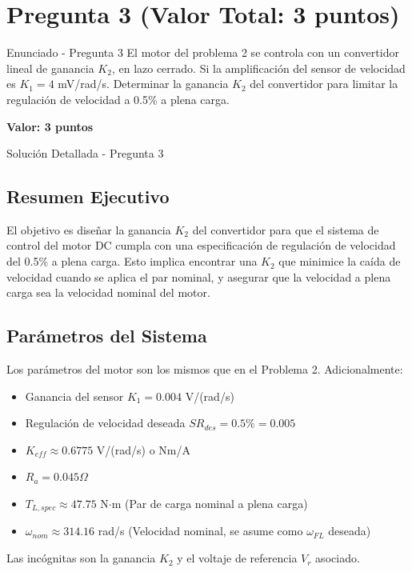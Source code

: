 \documentclass[12pt]{article}
\begin{document}
\newpage
\section{Pregunta 3 (Valor Total: 3 puntos)}
\begin{problemstatementbox}{Enunciado - Pregunta 3}
El motor del problema 2 se controla con un convertidor lineal de ganancia $K_2$, en lazo cerrado. Si la amplificación del sensor de velocidad es $K_1 = 4$ mV/rad/s. Determinar la ganancia $K_2$ del convertidor para limitar la regulación de velocidad a 0.5\% a plena carga.
\begin{center}
    \colorbox{gray!20}{\textbf{Valor: 3 puntos}}
\end{center}
\end{problemstatementbox}

\begin{solutionbox}{Solución Detallada - Pregunta 3}

\subsection*{Resumen Ejecutivo}
El objetivo es diseñar la ganancia $K_2$ del convertidor para que el sistema de control del motor DC cumpla con una especificación de regulación de velocidad del 0.5\% a plena carga. Esto implica encontrar una $K_2$ que minimice la caída de velocidad cuando se aplica el par nominal, y asegurar que la velocidad a plena carga sea la velocidad nominal del motor.

\subsection*{Parámetros del Sistema}
Los parámetros del motor son los mismos que en el Problema 2. Adicionalmente:
\begin{itemize}
    \item Ganancia del sensor $K_1 = 0.004$ V/(rad/s)
    \item Regulación de velocidad deseada $SR_{des} = 0.5\% = 0.005$
    \item $K_{eff} \approx 0.6775$ V/(rad/s) o Nm/A
    \item $R_a = 0.045 \Omega$
    \item $T_{L,spec} \approx 47.75$ N$\cdot$m (Par de carga nominal a plena carga)
    \item $\omega_{nom} \approx 314.16$ rad/s (Velocidad nominal, se asume como $\omega_{FL}$ deseada)
\end{itemize}
Las incógnitas son la ganancia $K_2$ y el voltaje de referencia $V_r$ asociado.


\end{solutionbox}
\end{document}
